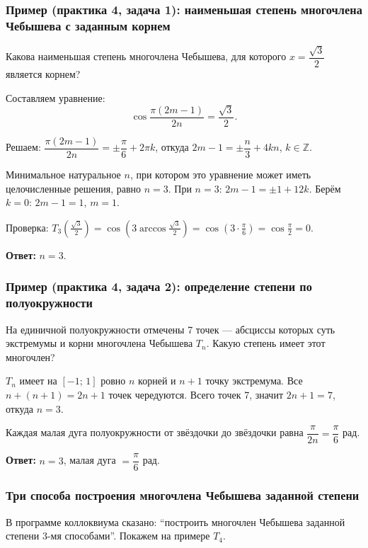 \subsubsection*{Пример (практика 4, задача 1): наименьшая степень многочлена Чебышева с заданным корнем}

Какова наименьшая степень многочлена Чебышева, для которого $x = \dfrac{\sqrt{3}}{2}$ является корнем?

Составляем уравнение:
\[
    \cos\frac{\pi(2m-1)}{2n} = \frac{\sqrt{3}}{2}.
\]

Решаем: $\dfrac{\pi(2m-1)}{2n} = \pm\dfrac{\pi}{6} + 2\pi k$, откуда $2m - 1 = \pm\dfrac{n}{3} + 4kn$, $k \in \mathbb{Z}$.

Минимальное натуральное $n$, при котором это уравнение может иметь целочисленные решения, равно $n = 3$. При $n = 3$: $2m - 1 = \pm 1 + 12k$. Берём $k = 0$: $2m - 1 = 1$, $m = 1$.

Проверка: $T_3\!\left(\frac{\sqrt{3}}{2}\right) = \cos\!\left(3\arccos\frac{\sqrt{3}}{2}\right) = \cos\!\left(3 \cdot \frac{\pi}{6}\right) = \cos\frac{\pi}{2} = 0$. \checkmark

\textbf{Ответ:} $n = 3$.


\subsubsection*{Пример (практика 4, задача 2): определение степени по полуокружности}

На единичной полуокружности отмечены 7 точек --- абсциссы которых суть экстремумы и корни многочлена Чебышева $T_n$. Какую степень имеет этот многочлен?

$T_n$ имеет на $[-1;\,1]$ ровно $n$ корней и $n + 1$ точку экстремума. Все $n + (n+1) = 2n + 1$ точек чередуются. Всего точек 7, значит $2n + 1 = 7$, откуда $n = 3$.

Каждая малая дуга полуокружности от звёздочки до звёздочки равна $\dfrac{\pi}{2n} = \dfrac{\pi}{6}$ рад.

\textbf{Ответ:} $n = 3$, малая дуга $= \dfrac{\pi}{6}$ рад.


\subsubsection*{Три способа построения многочлена Чебышева заданной степени}

В программе коллоквиума сказано: ``построить многочлен Чебышева заданной степени 3-мя способами''. Покажем на примере $T_4$.

